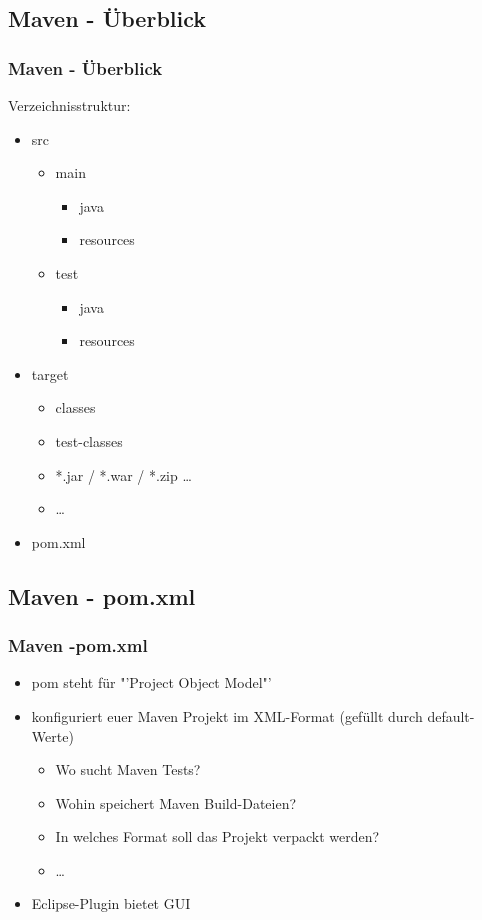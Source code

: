 \documentclass[18pt]{beamer}
\begin{document}
	\subsection{Maven - Überblick}
	\begin{frame}
		\frametitle{Maven - Überblick}
		Verzeichnisstruktur:
		\begin{itemize}
			\item src
			\begin{itemize}
				\item main
				\begin{itemize}
					\item java
					\item resources
				\end{itemize}
				\item test
				\begin{itemize}
					\item java
					\item resources
				\end{itemize}
			\end{itemize}
			\item target
			\begin{itemize}
				\item classes
				\item test-classes
				\item *.jar / *.war / *.zip \dots
				\item \dots
			\end{itemize}
			\item pom.xml
		\end{itemize}
	\end{frame}
	
	\subsection{Maven - pom.xml}
	\begin{frame}
		\frametitle{Maven -pom.xml}
		\begin{itemize}
			\item pom steht für "'Project Object Model"'
			\item konfiguriert euer Maven Projekt im XML-Format (gefüllt durch default-Werte)
			\begin{itemize}
				\item Wo sucht Maven Tests?
				\item Wohin speichert Maven Build-Dateien?
				\item In welches Format soll das Projekt verpackt werden?
				\item \dots
			\end{itemize}
			\item Eclipse-Plugin bietet GUI
		\end{itemize}
	\end{frame}
	
\end{document}
